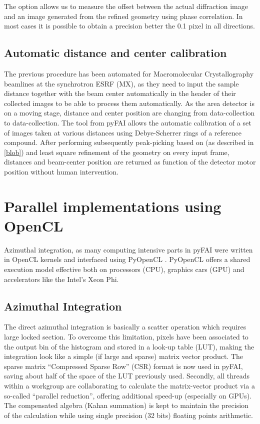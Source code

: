\documentclass[preprint]{iucr}
\begin{document}
The  option allows us to measure the offset between the actual
diffraction image and an image generated from the refined geometry using phase
correlation. In most cases it is possible to obtain a precision better the 0.1
pixel in all directions.

\subsection{Automatic distance and center calibration}
The previous procedure has been automated for Macromolecular Crystallography
beamlines at the synchrotron ESRF (MX), as they need to input the sample
distance together  with the beam center automatically in the header of their
collected images to be able to process them automatically. 
As the area detector is on a moving stage, distance and center position are
changing from data-collection to data-collection.
The  tool from pyFAI allows the automatic calibration of
a set of images taken at various distances using Debye-Scherrer rings of a
reference compound.
After performing subsequently peak-picking based on 
(as described in \ref{blob}) and least square refinement of the geometry on
every input frame, distances and beam-center position are returned as function
of the detector motor position without human intervention.

\section{Parallel implementations using OpenCL}
Azimuthal integration, as  many computing intensive parts in pyFAI were written
in OpenCL kernels and interfaced using PyOpenCL \cite{pyopencl}. PyOpenCL offers a
shared execution model effective both on processors (CPU), graphics cars (GPU)
and accelerators like the Intel's Xeon Phi.

\subsection{Azimuthal Integration}
The direct azimuthal integration is basically a scatter operation which
requires large locked section.
To overcome this limitation, pixels have been
associated to the output bin of the histogram and stored in a look-up
table (LUT), making the integration look like a simple (if large and sparse)
matrix vector product.
The sparse matrix ``Compressed Sparse Row'' (CSR) format is now used in pyFAI,
saving about half of the space of the LUT previously used.
Secondly, all threads within a workgroup are collaborating to calculate the
matrix-vector product via a so-called ``parallel reduction'', offering
additional speed-up (especially on GPUs).
The compensated algebra (Kahan summation) is kept to maintain the precision
of the calculation while using single precision (32 bits) floating points
arithmetic. 
\end{document}

